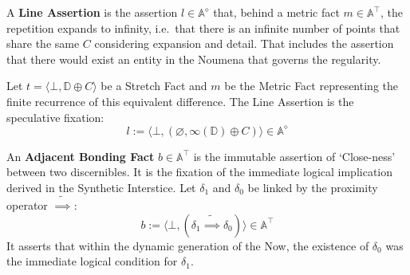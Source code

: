 \begin{formalism}
    A \textbf{Line Assertion} is the assertion $l \in \mathbb{A}^\diamond$
    that, behind a metric fact $m \in \mathbb{A}^\top$, the repetition
    expands to infinity, i.e.\ that there is an infinite number of points
    that share the same $C$ considering expansion and detail. That includes
    the assertion that there would exist an entity in the Noumena that
    governs the regularity.

    Let $t = \langle \bot, \mathbb{D} \oplus C \rangle$ be a Stretch Fact
    and $m$ be the Metric Fact representing the finite recurrence of this
    equivalent difference. The Line Assertion is the speculative fixation:
    \begin{equation}
        l := \langle \bot, (\varnothing, \infty(\mathbb{D}) \oplus C) \rangle \in \mathbb{A}^\diamond
    \end{equation}
\end{formalism}




\begin{formalism}  %
    An \textbf{Adjacent Bonding Fact} $b \in \mathbb{A}^\top$ is the
    immutable assertion of `Close-ness' between two discernibles. It is the
    fixation of the immediate logical implication derived in the Synthetic
    Interstice. Let $\delta_1$ and $\delta_0$ be linked by the proximity
    operator $\tilde{\implies}$:
    \begin{equation}
        b := \langle \bot, (\delta_1 \tilde{\implies} \delta_0) \rangle \in \mathbb{A}^\top
    \end{equation}
    It asserts that within the dynamic generation of the Now, the existence
    of $\delta_0$ was the immediate logical condition for $\delta_1$.
\end{formalism}

